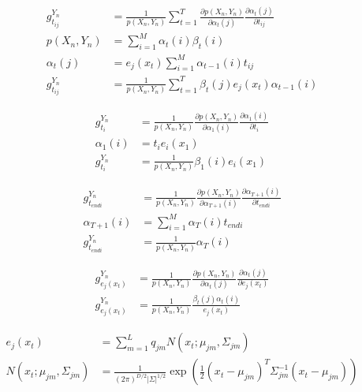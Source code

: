 \begin{align*}
g_{t_{ij}}^{Y_n} &= \frac{1}{p(X_n, Y_n)}\sum_{t = 1}^T \frac{\partial p(X_n, Y_n)}{\partial \alpha_t(j)}\frac{\partial \alpha_t(j)}{\partial t_{ij}} \\
p(X_n, Y_n) &= \sum_{i = 1}^M\alpha_t(i)\beta_t(i)\\
\alpha_t(j) &= e_j(x_t)\sum_{i = 1}^M\alpha_{t-1}(i)t_{ij}\\
g_{t_{ij}}^{Y_n} &= \frac{1}{p(X_n, Y_n)}\sum_{t = 1}^T\beta_t(j)e_j(x_t)\alpha_{t - 1}(i)
\end{align*} 

\begin{align*}
g_{t_i}^{Y_n} &= \frac{1}{p(X_n, Y_n)}\frac{\partial p(X_n, Y_n)}{\partial \alpha_1(i)}\frac{\partial \alpha_1(i)}{\partial t_i} \\
\alpha_1(i) &= t_ie_i(x_1)\\
g_{t_i}^{Y_n} &= \frac{1}{p(X_n, Y_n)}\beta_1(i)e_i(x_1)
\end{align*} 

\begin{align*}
g_{t_{endi}}^{Y_n} &= \frac{1}{p(X_n, Y_n)}\frac{\partial p(X_n, Y_n)}{\partial \alpha_{T+1}(i)}\frac{\partial \alpha_{T+1}(i)}{\partial t_{endi}} \\
\alpha_{T+1}(i) &= \sum_{i = 1}^M \alpha_T(i)t_{endi}\\
g_{t_{endi}}^{Y_n} &= \frac{1}{p(X_n, Y_n)}\alpha_T(i)
\end{align*} 

\begin{align*}
g_{e_j(x_t)}^{Y_n} &= \frac{1}{p(X_n, Y_n)}\frac{\partial p(X_n, Y_n)}{\partial \alpha_t(j)}\frac{\partial \alpha_t(j)}{\partial e_j(x_t)} \\
g_{e_j(x_t)}^{Y_n} &= \frac{1}{p(X_n, Y_n)}\frac{\beta_t(j)\alpha_t(i)}{e_j(x_t)}
\end{align*} 

\begin{align}
e_j(x_t) &= \sum_{m=1}^{L}q_{jm}N(x_t; \mu_{jm}, \Sigma_{jm})\\
N(x_t; \mu_{jm}, \Sigma_{jm}) &= \frac{1}{(2\pi)^{D/2}|\Sigma|^{1/2}}\exp(\frac{1}{2}(x_t-\mu_{jm})^T\Sigma_{jm}^{-1}(x_t-\mu_{jm}))
\end{align}

